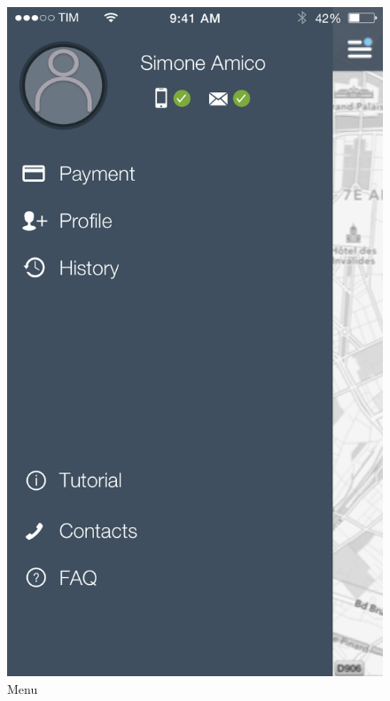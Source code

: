\documentclass[12pt]{article}
\begin{document}
\begin{figure}
 	 	  \includegraphics[scale=0.25]{Images/mobileApp/Menu.png}
		  \caption{Menu}
		  \endminipage
 	 	\end{figure}
 	 	
 	 \FloatBarrier
\end{document}
